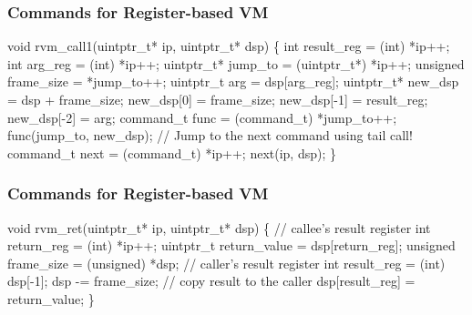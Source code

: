 \documentclass[hyperref={colorlinks=true},xcolor=table]{beamer}
\begin{document}
\footnotesize
\begin{frame}[fragile]
  \frametitle{Commands for Register-based VM}
  \begin{CodeNoLabel}
void rvm_call1(uintptr_t* ip, uintptr_t* dsp) \{
    int result_reg = (int) *ip++;
    int arg_reg = (int) *ip++;
    uintptr_t* jump_to = (uintptr_t*) *ip++;
    unsigned frame_size = *jump_to++;
    uintptr_t arg = dsp[arg_reg];
    uintptr_t* new_dsp = dsp + frame_size;
    new_dsp[0] = frame_size;
    new_dsp[-1] = result_reg;
    new_dsp[-2] = arg;
    command_t func = (command_t) *jump_to++;
    func(jump_to, new_dsp);
    // Jump to the next command using tail call!
    command_t next = (command_t) *ip++; next(ip, dsp);
\}
  \end{CodeNoLabel}
\end{frame}
\normalsize

\footnotesize
\begin{frame}[fragile]
  \frametitle{Commands for Register-based VM}
  \begin{CodeNoLabel}
void rvm_ret(uintptr_t* ip, uintptr_t* dsp) \{
    // callee's result register
    int return_reg = (int) *ip++;
    uintptr_t return_value = dsp[return_reg];
    unsigned frame_size = (unsigned) *dsp;
    // caller's result register
    int result_reg = (int) dsp[-1];
    dsp -= frame_size;
    // copy result to the caller
    dsp[result_reg] = return_value;
\}
  \end{CodeNoLabel}
\end{frame}
\normalsize
\end{document}
